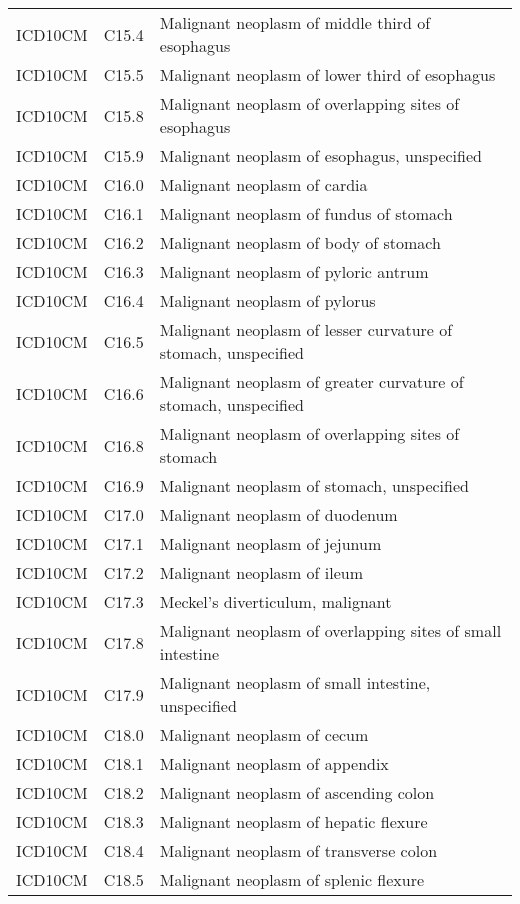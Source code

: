 \begin{longtable}{p{}p{}p{}}
  ICD10CM & C15.4 & Malignant neoplasm of middle third of esophagus \\ 
  ICD10CM & C15.5 & Malignant neoplasm of lower third of esophagus \\ 
  ICD10CM & C15.8 & Malignant neoplasm of overlapping sites of esophagus \\ 
  ICD10CM & C15.9 & Malignant neoplasm of esophagus, unspecified \\ 
  ICD10CM & C16.0 & Malignant neoplasm of cardia \\ 
  ICD10CM & C16.1 & Malignant neoplasm of fundus of stomach \\ 
  ICD10CM & C16.2 & Malignant neoplasm of body of stomach \\ 
  ICD10CM & C16.3 & Malignant neoplasm of pyloric antrum \\ 
  ICD10CM & C16.4 & Malignant neoplasm of pylorus \\ 
  ICD10CM & C16.5 & Malignant neoplasm of lesser curvature of stomach, unspecified \\ 
  ICD10CM & C16.6 & Malignant neoplasm of greater curvature of stomach, unspecified \\ 
  ICD10CM & C16.8 & Malignant neoplasm of overlapping sites of stomach \\ 
  ICD10CM & C16.9 & Malignant neoplasm of stomach, unspecified \\ 
  ICD10CM & C17.0 & Malignant neoplasm of duodenum \\ 
  ICD10CM & C17.1 & Malignant neoplasm of jejunum \\ 
  ICD10CM & C17.2 & Malignant neoplasm of ileum \\ 
  ICD10CM & C17.3 & Meckel's diverticulum, malignant \\ 
  ICD10CM & C17.8 & Malignant neoplasm of overlapping sites of small intestine \\ 
  ICD10CM & C17.9 & Malignant neoplasm of small intestine, unspecified \\ 
  ICD10CM & C18.0 & Malignant neoplasm of cecum \\ 
  ICD10CM & C18.1 & Malignant neoplasm of appendix \\ 
  ICD10CM & C18.2 & Malignant neoplasm of ascending colon \\ 
  ICD10CM & C18.3 & Malignant neoplasm of hepatic flexure \\ 
  ICD10CM & C18.4 & Malignant neoplasm of transverse colon \\ 
  ICD10CM & C18.5 & Malignant neoplasm of splenic flexure \\ 

\end{longtable}
